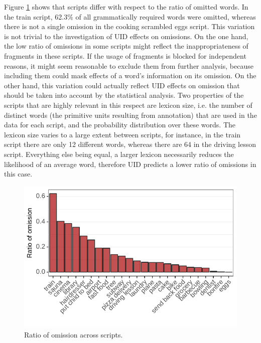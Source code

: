 Figure \ref{fig:scripts-ellratio} shows that scripts differ with respect to the ratio of omitted words. In the train script, 62.3\% of all grammatically required words were omitted, whereas there is not a single omission in the cooking scrambled eggs script. This variation is not trivial to the investigation of UID effects on omissions. On the one hand, the low ratio of omissions in some scripts might reflect the inappropriateness of fragments in these scripts. If the usage of fragments is blocked for independent reasons, it might seem reasonable to exclude them from further analysis, because including them could mask effects of a word's information on its omission. On the other hand, this variation could actually reflect UID effects on omission that should be taken into account by the statistical analysis. Two properties of the scripts that are highly relevant in this respect are lexicon size, i.e. the number of distinct words (the primitive units resulting from annotation) that are used in the data for each script, and the probability distribution over these words. The lexicon size varies to a large extent between scripts, for instance, in the train script there are only 12 different words, whereas there are 64 in the driving lesson script. Everything else being equal, a larger lexicon necessarily reduces the likelihood of an average word, therefore UID predicts a lower ratio of omissions in this case.

\begin{figure}
 \includegraphics{figures/scr_production_omission_ratio}
 \caption{Ratio of omission across scripts.\label{fig:scripts-ellratio}}
\end{figure}

